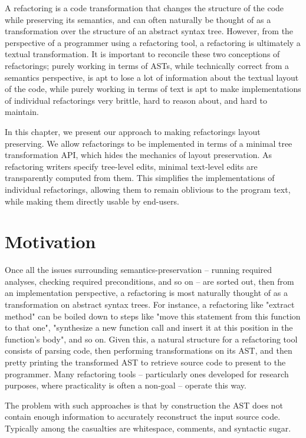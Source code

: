 A refactoring is a code transformation that changes the structure of the code
while preserving its semantics, and can often naturally be thought of as a
transformation over the structure of an abstract syntax tree. However, from
the perspective of a programmer using a refactoring tool, a refactoring is
ultimately a textual transformation. It is important to reconcile these two
conceptions of refactorings; purely working in terms of ASTs, while
technically correct from a semantics perspective, is apt to lose a lot
of information about the textual layout of the code, while purely working
in terms of text is apt to make implementations of individual refactorings
very brittle, hard to reason about, and hard to maintain.

In this chapter, we present our approach to making refactorings layout
preserving.  We allow refactorings to be implemented in terms of a minimal tree
transformation API, which hides the mechanics of layout preservation. As
refactoring writers specify tree-level edits, minimal text-level edits are
transparently computed from them. This simplifies the implementations of
individual refactorings, allowing them to remain oblivious to the program text,
while making them directly usable by end-users.

\section{Motivation}

Once all the issues surrounding semantics-preservation -- running required
analyses, checking required preconditions, and so on -- are sorted out,
then from an implementation perspective, a refactoring is most
naturally thought of as a transformation on abstract syntax trees. For
instance, a refactoring like "extract method" can be boiled down to steps like
"move this statement from this function to that one", "synthesize a new
function call and insert it at this position in the function's body", and so
on. Given this, a natural structure for a refactoring tool consists of parsing
code, then performing transformations on its AST, and then pretty printing the
transformed AST to retrieve source code to present to the programmer. Many
refactoring tools -- particularly ones developed for research purposes, where
practicality is often a non-goal -- operate this way.

The problem with such approaches is that by construction the AST does not
contain enough information to accurately reconstruct the input source code.
Typically among the casualties are whitespace, comments, and syntactic sugar.

